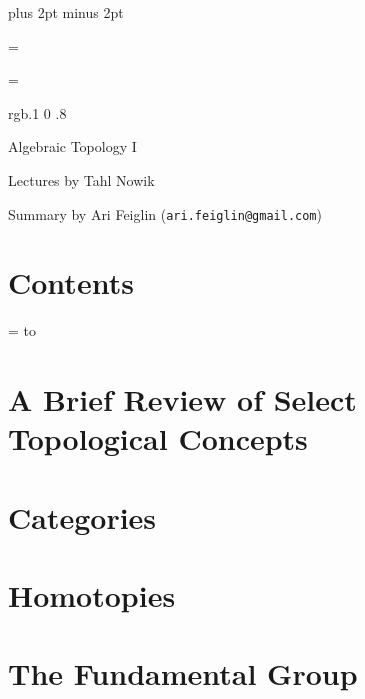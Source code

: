 

\parindent=0pt
\parskip=3pt plus 2pt minus 2pt



\def\printmcount{\the\counter{section}.\the\counter{math counter}}

\footline={}


\headline={}

\color rgb{.1 0 .8}

{\def\boxshadowcolor{rgb{.3 .3 .8}}

    \centerline{Algebraic Topology I}
    \smallskip
    \centerline{Lectures by Tahl Nowik}
    \centerline{Summary by Ari Feiglin ({\tt ari.feiglin@gmail.com})}

\eppbox

\bigskip

    \section*{Contents}
    
    \tableofcontents
\eppbox

}

\vfill\break

\color{black}

\newif\ifpageodd
\pageoddtrue
\headline={%
    \hbox to \hsize{\color{black}%
        \ifpageodd\hfil{\it\currsubsection\quad\bf\folio}\global\pageoddfalse%
        \else{\bf\folio\quad\it\currsubsection}\hfil\global\pageoddtrue\fi%
    }%
}

\section{A Brief Review of Select Topological Concepts}



\vfill\break

\section{Categories}



\vfill\break

\section{Homotopies}



\vfill\break

\section{The Fundamental Group}



\bye

